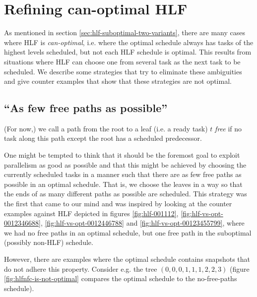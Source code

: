 \section{Refining can-optimal HLF}
\label{sec:suboptimal-hlf-can-optimal-strategies}

As mentioned in section \ref{sec:hlf-suboptimal-two-variants}, there are many cases where HLF is \emph{can-optimal}, i.e. where the optimal schedule always has tasks of the highest levels scheduled, but not each HLF schedule is optimal. This results from situations where HLF can choose one from several task as the next task to be scheduled. We describe some strategies that try to eliminate these ambiguities and give counter examples that show that these strategies are not optimal.

\subsection{``As few free paths as possible''}
\label{sec:disproving-hlf-no-free-chain}

(For now,) we call a path from the root to a leaf (i.e. a ready task) $t$ \emph{free} if no task along this path except the root has a scheduled predecessor.

One might be tempted to think that it should be the foremost goal to exploit parallelism as good as possible and that this might be achieved by choosing the currently scheduled tasks in a manner such that there are as few free paths as possible in an optimal schedule. That is, we choose the leaves in a way so that the ends of as many different paths as possible are scheduled. This strategy was the first that came to our mind and was inspired by looking at the counter examples against HLF depicted in figures \ref{fig:hlf-001112}, \ref{fig:hlf-vs-opt-0012346688}, \ref{fig:hlf-vs-opt-0012446788} and \ref{fig:hlf-vs-opt-00123455799}, where we had no free paths in an optimal schedule, but one free path in the suboptimal (possibly non-HLF) schedule. %

However, there are examples where the optimal schedule contains snapshots that do not adhere this property. Consider e.g. the tree $(0,0,0,1,1,1,2,2,3)$ (figure \ref{fig:hlfnfc-is-not-optimal} compares the optimal schedule to the no-free-paths schedule).

